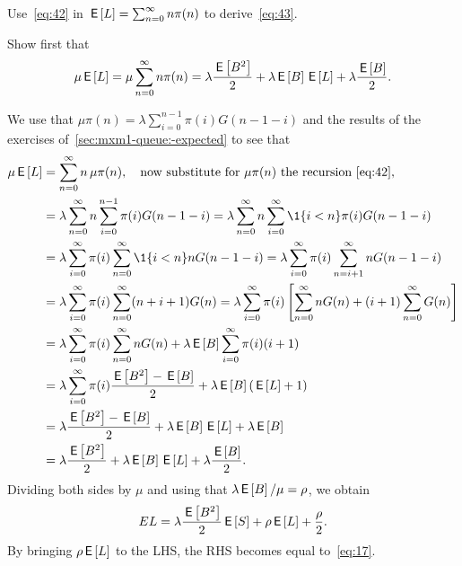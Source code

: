 \documentclass[stochastic-or.tex]{subfiles}
\begin{document}
\begin{extra}\label{ex:73}
Use~\cref{eq:42}
in $\,\mathsf{E}\left[L\right] = \sum_{n=0}^\infty n \pi(n)$ to derive~\cref{eq:43}.
\begin{hint}
  Show first that
\begin{equation*}
 \mu \,\mathsf{E}\left[L\right] =\mu \sum_{n=0}^\infty n \pi(n) = \lambda \frac{\,\mathsf{E}\left[B^2\right]}2 + \lambda \,\mathsf{E}\left[B\right] \,\mathsf{E}\left[L\right] +\lambda \frac{\,\mathsf{E}\left[B\right]}2.
\end{equation*}
\end{hint}
\begin{solution}
 We use that $\mu \pi(n) =\lambda \sum_{i=0}^{n-1} \pi(i) G(n-1-i)$ and the results of the exercises of~\cref{sec:mxm1-queue:-expected} to see that
\begin{align*}
 \mu \E \L
 &=\sum_{n=0}^\infty n\, \mu \pi(n), \quad \text{now substitute for $\mu \pi(n)$ the recursion~\cref{eq:42}}, \\
& =\lambda \sum_{n=0}^\infty n \sum_{i=0}^{n-1} \pi(i) G(n-1-i)
 =\lambda \sum_{n=0}^\infty n \sum_{i=0}^\infty \1{i<n} \pi(i) G(n-1-i) \\
& =\lambda \sum_{i=0}^\infty \pi(i) \sum_{n=0}^\infty \1{i<n} n G(n-1-i)
 =\lambda \sum_{i=0}^\infty \pi(i) \sum_{n=i+1}^\infty n G(n-1-i) \\
& =\lambda \sum_{i=0}^\infty \pi(i) \sum_{n=0}^\infty (n+i+1) G(n)
 =\lambda \sum_{i=0}^\infty \pi(i) \left[\sum_{n=0}^\infty n G(n) +(i+1) \sum_{n=0}^\infty G(n)\right] \\
 &=\lambda \sum_{i=0}^\infty \pi(i)\sum_{n=0}^\infty n G(n) +\lambda \E B \sum_{i=0}^\infty \pi(i) (i+1) \\
 &=\lambda \sum_{i=0}^\infty \pi(i) \frac{\E{B^2} -\E B}2 + \lambda \E B (\E \L +1) \\
 &= \lambda \frac{\E{B^2} -\E B}2 + \lambda \E B \E \L +\lambda \E B \\
 &= \lambda \frac{\E{B^2} }2 + \lambda \E B \E \L +\lambda \frac{\E B}2.
\end{align*}
Dividing both sides by $\mu$ and using that $\lambda \,\mathsf{E}\left[B\right]/\mu = \rho$, we obtain
\begin{equation*}
E L = \lambda \frac{\,\mathsf{E}\left[B^2\right]}2 \,\mathsf{E}\left[S\right] + \rho \,\mathsf{E}\left[L\right] + \frac\rho2.
\end{equation*}
By bringing $\rho \,\mathsf{E}\left[L\right]$ to the LHS, the RHS becomes equal to~\cref{eq:17}.
\end{solution}
\end{extra}


\end{document}

